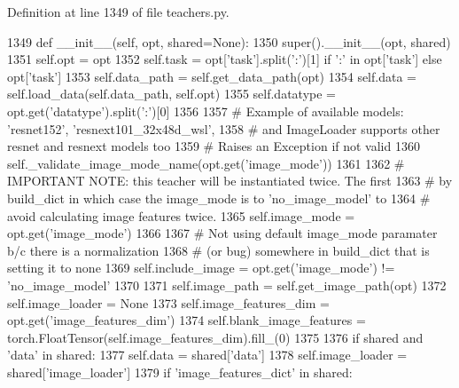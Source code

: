 Definition at line 1349 of file teachers.\+py.


\begin{DoxyCode}
1349     \textcolor{keyword}{def }\_\_init\_\_(self, opt, shared=None):
1350         super().\_\_init\_\_(opt, shared)
1351         self.opt = opt
1352         self.task = opt[\textcolor{stringliteral}{'task'}].split(\textcolor{stringliteral}{':'})[1] \textcolor{keywordflow}{if} \textcolor{stringliteral}{':'} \textcolor{keywordflow}{in} opt[\textcolor{stringliteral}{'task'}] \textcolor{keywordflow}{else} opt[\textcolor{stringliteral}{'task'}]
1353         self.data\_path = self.get\_data\_path(opt)
1354         self.data = self.load\_data(self.data\_path, self.opt)
1355         self.datatype = opt.get(\textcolor{stringliteral}{'datatype'}).split(\textcolor{stringliteral}{':'})[0]
1356 
1357         \textcolor{comment}{# Example of available models: 'resnet152', 'resnext101\_32x48d\_wsl',}
1358         \textcolor{comment}{# and ImageLoader supports other resnet and resnext models too}
1359         \textcolor{comment}{# Raises an Exception if not valid}
1360         self.\_validate\_image\_mode\_name(opt.get(\textcolor{stringliteral}{'image\_mode'}))
1361 
1362         \textcolor{comment}{# IMPORTANT NOTE: this teacher will be instantiated twice. The first}
1363         \textcolor{comment}{# by build\_dict in which case the image\_mode is to 'no\_image\_model' to}
1364         \textcolor{comment}{# avoid calculating image features twice.}
1365         self.image\_mode = opt.get(\textcolor{stringliteral}{'image\_mode'})
1366 
1367         \textcolor{comment}{# Not using default image\_mode paramater b/c there is a normalization}
1368         \textcolor{comment}{# (or bug) somewhere in build\_dict that is setting it to none}
1369         self.include\_image = opt.get(\textcolor{stringliteral}{'image\_mode'}) != \textcolor{stringliteral}{'no\_image\_model'}
1370 
1371         self.image\_path = self.get\_image\_path(opt)
1372         self.image\_loader = \textcolor{keywordtype}{None}
1373         self.image\_features\_dim = opt.get(\textcolor{stringliteral}{'image\_features\_dim'})
1374         self.blank\_image\_features = torch.FloatTensor(self.image\_features\_dim).fill\_(0)
1375 
1376         \textcolor{keywordflow}{if} shared \textcolor{keywordflow}{and} \textcolor{stringliteral}{'data'} \textcolor{keywordflow}{in} shared:
1377             self.data = shared[\textcolor{stringliteral}{'data'}]
1378             self.image\_loader = shared[\textcolor{stringliteral}{'image\_loader'}]
1379             \textcolor{keywordflow}{if} \textcolor{stringliteral}{'image\_features\_dict'} \textcolor{keywordflow}{in} shared:

\end{DoxyCode}
